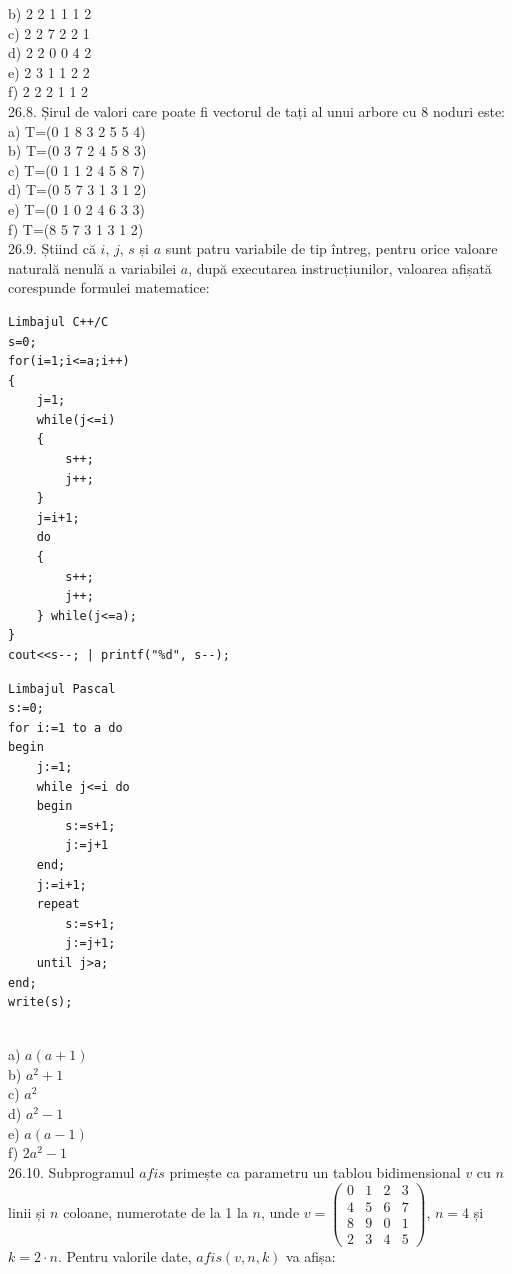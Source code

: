 {{b) 2 2 1 1 1 2
\\
c) 2 2 7 2 2 1
\\
d) 2 2 0 0 4 2
\\
e) 2 3 1 1 2 2
\\
f) 2 2 2 1 1 2
\\
26.8. Șirul de valori care poate fi vectorul de tați al unui arbore cu 8 noduri este:
\\
a) T=(0 1 8 3 2 5 5 4)
\\
b) T=(0 3 7 2 4 5 8 3)
\\
c) T=(0 1 1 2 4 5 8 7)
\\
d) T=(0 5 7 3 1 3 1 2)
\\
e) T=(0 1 0 2 4 6 3 3)
\\
f) T=(8 5 7 3 1 3 1 2)
\\
26.9. Știind că $i$, $j$, $s$ și $a$ sunt patru variabile de tip întreg, pentru orice valoare naturală nenulă a variabilei $a$, după executarea instrucțiunilor, valoarea afișată corespunde formulei matematice:
\begin{verbatim}
Limbajul C++/C
s=0;
for(i=1;i<=a;i++)
{
    j=1;
    while(j<=i)
    {
        s++;
        j++;
    }
    j=i+1;
    do
    {
        s++;
        j++;
    } while(j<=a);
}
cout<<s--; | printf("%d", s--);
\end{verbatim}
\begin{verbatim}
Limbajul Pascal
s:=0;
for i:=1 to a do
begin
    j:=1;
    while j<=i do
    begin
        s:=s+1;
        j:=j+1
    end;
    j:=i+1;
    repeat
        s:=s+1;
        j:=j+1;
    until j>a;
end;
write(s);
\end{verbatim}
\\
a) $a(a+1)$
\\
b) $a^{2}+1$
\\
c) $a^{2}$
\\
d) $a^{2}-1$
\\
e) $a(a-1)$
\\
f) $2 a^{2}-1$
\\
26.10. Subprogramul $afis$ primește ca parametru un tablou bidimensional $v$ cu $n$ linii și $n$ coloane, numerotate de la 1 la $n$, unde $v=\left(\begin{array}{llll} 0 & 1 & 2 & 3 \\ 4 & 5 & 6 & 7 \\ 8 & 9 & 0 & 1 \\ 2 & 3 & 4 & 5 \end{array}\right)$, $n=4$ și $k=2 \cdot n$. Pentru valorile date, $afis(v, n, k)$ va afișa:
\\
}}
